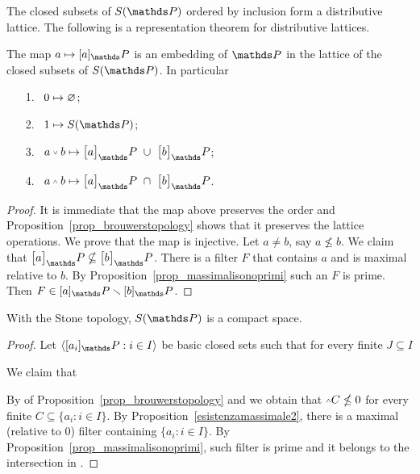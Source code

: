 \documentclass[creche.tex]{subfiles}
\begin{document}
The closed subsets of $S(\PP)$ ordered by inclusion form a distributive lattice. The following is a representation theorem for distributive lattices.

\begin{theorem}
The map $a\mapsto [a]_\PP$ is an embedding of $\PP$ in the lattice of the closed subsets of $S(\PP)$. In particular
\begin{itemize}
\item[1.]\ $0\mapsto \varnothing$;
\item[2.]\ $1\mapsto S(\PP)$;
\item[3.]\ $a\svee b\mapsto \big[a\big]_\PP\ \cup\ \big[b\big]_\PP$;
\item[4.]\ $a\swedge b\mapsto\big[a\big]_\PP\ \cap\ \big[b\big]_\PP$.
\end{itemize}
\end{theorem}

\begin{proof}
It is immediate that the map above preserves the order and Proposition~\ref{prop_brouwerstopology} shows that it preserves the lattice operations. We prove that the map is injective. Let $a\neq b$, say  $a\nleq b$. We claim that $\big[a\big]_\PP\nsubseteq\big[b\big]_\PP$. There is a filter $F$ that contains $a$ and is maximal relative to $b$. By Proposition~\ref{prop_massimalisonoprimi} such an $F$ is prime. Then $F\in [a]_\PP\sm[b]_\PP$.
\end{proof}


\begin{theorem}\label{thm_reticolocompatto}
With the Stone topology, $S(\PP)$ is a compact space.
\end{theorem}
\begin{proof}
Let $\<[a_i]_\PP:i\in I\>$ be basic closed sets such that for every finite $J\subseteq I$


We claim that


By  of Proposition~\ref{prop_brouwerstopology} and  we obtain that $\swedge C\nleq 0$ for every finite $C\subseteq \{a_i:i\in I\}$. By Proposition~\ref{esistenzamassimale2}, there is a maximal (relative to $0$) filter containing $\{a_i:i\in I\}$. By Proposition~\ref{prop_massimalisonoprimi}, such filter is prime and it belongs to the intersection in .
\end{proof}
\end{document}
